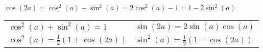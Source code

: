 \documentclass[12pt]{article}
\begin{document}
\begin{spacing}{0.8}
\begin{multicols*}{2}
\begin{flushleft}
\begin{outline}[longenum]
\\
$\cos(2a)=\cos^2(a) - \sin^2(a) = 2\cos^2(a)-1 = 1-2\sin^2(a)$
\\
\begin{tabular}{l|l}
$\cos^2(a)+\sin^2(a)=1$ & $\sin(2a) = 2\sin(a)\cos(a)$ \\
$\cos^2(a) = \frac{1}{2}(1 + \cos(2a))$ & $\sin^2(a) = \frac{1}{2}(1 - \cos(2a))$ \\
\end{tabular}




\end{outline}
\end{flushleft}
\end{multicols*}
\end{spacing}
\end{document}
